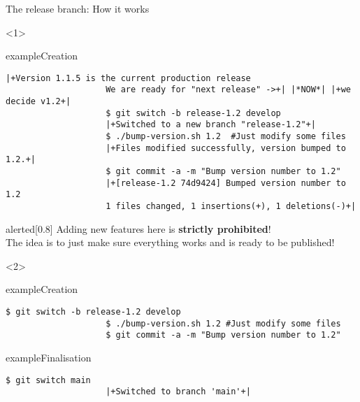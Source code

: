 \documentclass[usenames,svgnames,14pt]{beamer}
\begin{document}
\begin{frame}[fragile,c]{The release branch: How it works}
    \begin{overlayarea}{\textwidth}{0.9\textheight}
        \vspace{-5mm}
        \begin{onlyenv}<1>
            \begin{varblock}{example}{Creation}
                \begin{lstlisting}[style=MyBash]
                    |+Version 1.1.5 is the current production release
                    We are ready for "next release" ->+| |*NOW*| |+we decide v1.2+|
                    $ git switch -b release-1.2 develop
                    |+Switched to a new branch "release-1.2"+|
                    $ ./bump-version.sh 1.2  #Just modify some files
                    |+Files modified successfully, version bumped to 1.2.+|
                    $ git commit -a -m "Bump version number to 1.2"
                    |+[release-1.2 74d9424] Bumped version number to 1.2
                    1 files changed, 1 insertions(+), 1 deletions(-)+|
                \end{lstlisting}
            \end{varblock}
            \begin{varblock}{alerted}[0.8\textwidth]{}
                \alert{Adding new features here is \textbf{strictly prohibited}!}\\
                The idea is to just make sure everything works and is ready to be published!
            \end{varblock}
        \end{onlyenv}
        \begin{onlyenv}<2>
            \begin{varblock}{example}{Creation}
                \begin{lstlisting}[style=MyBash]
                    $ git switch -b release-1.2 develop
                    $ ./bump-version.sh 1.2 #Just modify some files
                    $ git commit -a -m "Bump version number to 1.2"
                \end{lstlisting}
            \end{varblock}
            \vspace{-2mm}
            \begin{varblock}{example}{Finalisation}
                \begin{lstlisting}[style=MyBash]
                    $ git switch main
                    |+Switched to branch 'main'+|

\end{lstlisting}
\end{varblock}
\end{onlyenv}
\end{overlayarea}
\end{frame}
\end{document}
